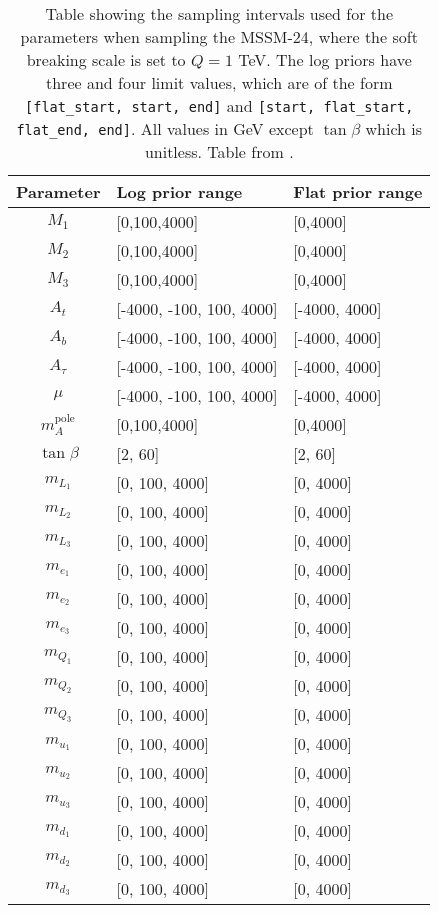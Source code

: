 \documentclass[twoside,english]{uiofysmaster}
\begin{document}
{\begin{table}
\centering
\begin{tabular}{@{}cll@{}} \toprule
Parameter & Log prior range & Flat prior range\\ \midrule
$M_1$ & [0,100,4000] & [0,4000]\\
$M_2$ & [0,100,4000] & [0,4000]\\
$M_3$ & [0,100,4000] & [0,4000]\\
$A_t$ & [-4000, -100, 100, 4000] & [-4000, 4000]\\
$A_b$ & [-4000, -100, 100, 4000] & [-4000, 4000]\\
$A_{\tau}$ & [-4000, -100, 100, 4000] & [-4000, 4000]\\
$\mu$ & [-4000, -100, 100, 4000] & [-4000, 4000]\\
$m_A^{\text{pole}}$ & [0,100,4000] & [0,4000]\\
$\tan \beta$ & [2, 60] & [2, 60]\\
$m_{L_1}$ & [0, 100, 4000] & [0, 4000]\\
$m_{L_2}$ & [0, 100, 4000] & [0, 4000]\\
$m_{L_3}$ & [0, 100, 4000] & [0, 4000]\\
$m_{e_1}$ & [0, 100, 4000] & [0, 4000]\\
$m_{e_2}$ & [0, 100, 4000] & [0, 4000]\\
$m_{e_3}$ & [0, 100, 4000] & [0, 4000]\\
$m_{Q_1}$ & [0, 100, 4000] & [0, 4000]\\
$m_{Q_2}$ & [0, 100, 4000] & [0, 4000]\\
$m_{Q_3}$ & [0, 100, 4000] & [0, 4000]\\
$m_{u_1}$ & [0, 100, 4000] & [0, 4000]\\
$m_{u_2}$ & [0, 100, 4000] & [0, 4000]\\
$m_{u_3}$ & [0, 100, 4000] & [0, 4000]\\
$m_{d_1}$ & [0, 100, 4000] & [0, 4000]\\
$m_{d_2}$ & [0, 100, 4000] & [0, 4000]\\
$m_{d_3}$ & [0, 100, 4000] & [0, 4000]\\ \bottomrule
\end{tabular}
\caption{Table showing the sampling intervals used for the parameters when sampling the MSSM-24, where the soft breaking scale is set to $Q = 1$ TeV. The log priors have three and four limit values, which are of the form \texttt{[flat\_start, start, end]} and \texttt{[start, flat\_start, flat\_end, end]}. All values in GeV except $\tan \beta$ which is unitless. Table from \cite{sparre2018fast}.}
\label{Tab:: evalualting cross : Feature distributions }
\end{table}

}
\end{document}
